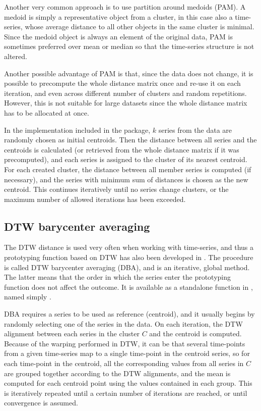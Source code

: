 Another very common approach is to use partition around medoids (PAM).
A medoid is simply a representative object from a cluster,
in this case also a time-series,
whose average distance to all other objects in the same cluster is minimal.
Since the medoid object is always an element of the original data,
PAM is sometimes preferred over mean or median so that the time-series structure is not altered.

Another possible advantage of PAM is that,
since the data does not change,
it is possible to precompute the whole distance matrix once and re-use it on each iteration,
and even across different number of clusters and random repetitions.
However, this is not suitable for large datasets since the whole distance matrix has to be allocated at once.

In the implementation included in the package,
$k$ series from the data are randomly chosen as initial centroids.
Then the distance between all series and the centroids is calculated
(or retrieved from the whole distance matrix if it was precomputed),
and each series is assigned to the cluster of its nearest centroid.
For each created cluster,
the distance between all member series is computed (if necessary),
and the series with minimum sum of distances is chosen as the new centroid.
This continues iteratively until no series change clusters,
or the maximum number of allowed iterations has been exceeded.

\subsection{DTW barycenter averaging}
\label{sec:dba}

The DTW distance is used very often when working with time-series,
and thus a prototyping function based on DTW has also been developed in \citet{petitjean2011}.
The procedure is called DTW barycenter averaging (DBA),
and is an iterative, global method.
The latter means that the order in which the series enter the prototyping function does not affect the outcome.
It is available as a standalone function in \dtwclust{}, named simply .

DBA requires a series to be used as reference (centroid),
and it usually begins by randomly selecting one of the series in the data.
On each iteration, the DTW alignment between each series in the cluster $C$ and the centroid is computed.
Because of the warping performed in DTW,
it can be that several time-points from a given time-series map to a single time-point in the centroid series,
so for each time-point in the centroid,
all the corresponding values from all series in $C$ are grouped together according to the DTW alignments,
and the mean is computed for each centroid point using the values contained in each group.
This is iteratively repeated until a certain number of iterations are reached,
or until convergence is assumed.

